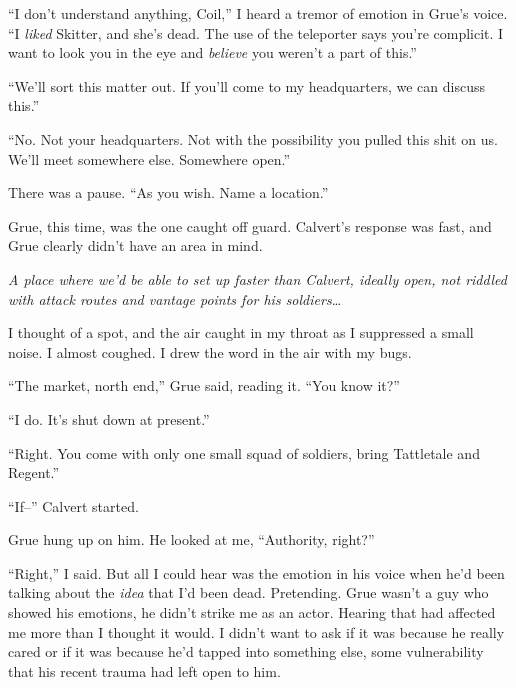 ``I don't understand anything, Coil,'' I heard a tremor of emotion in Grue's voice.  ``I \emph{liked} Skitter, and she's dead.  The use of the teleporter says you're complicit.  I want to look you in the eye and \emph{believe }you weren't a part of this.''



``We'll sort this matter out.  If you'll come to my headquarters, we can discuss this.''



``No.  Not your headquarters.  Not with the possibility you pulled this shit on us.  We'll meet somewhere else.  Somewhere open.''



There was a pause.  ``As you wish.  Name a location.''



Grue, this time, was the one caught off guard.  Calvert's response was fast, and Grue clearly didn't have an area in mind.



\emph{A place where we'd be able to set up faster than Calvert, ideally open, not riddled with attack routes and vantage points for his soldiers}\ldots



I thought of a spot, and the air caught in my throat as I suppressed a small noise.  I almost coughed.  I drew the word in the air with my bugs.



``The market, north end,'' Grue said, reading it.  ``You know it?''



``I do.  It's shut down at present.''



``Right.  You come with only one small squad of soldiers, bring Tattletale and Regent.''



``If--''  Calvert started.



Grue hung up on him.  He looked at me, ``Authority, right?''



``Right,'' I said.  But all I could hear was the emotion in his voice when he'd been talking about the \emph{idea} that I'd been dead.  Pretending.  Grue wasn't a guy who showed his emotions, he didn't strike me as an actor.  Hearing that had affected me more than I thought it would.  I didn't want to ask if it was because he really cared or if it was because he'd tapped into something else, some vulnerability that his recent trauma had left open to him.



